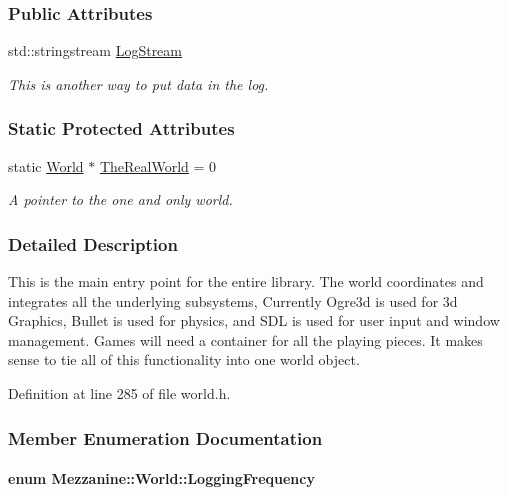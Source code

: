 \subsubsection*{Public Attributes}
\begin{DoxyCompactItemize}
\item 
std::stringstream \hyperlink{classMezzanine_1_1World_a32b1c4de1bbf5495452e463802ffa499}{LogStream}
\begin{DoxyCompactList}\small\item\em This is another way to put data in the log. \item\end{DoxyCompactList}\end{DoxyCompactItemize}
\subsubsection*{Static Protected Attributes}
\begin{DoxyCompactItemize}
\item 
\hypertarget{classMezzanine_1_1World_a86c5d362a144d6cad245fd022f512b21}{
static \hyperlink{classMezzanine_1_1World}{World} $\ast$ \hyperlink{classMezzanine_1_1World_a86c5d362a144d6cad245fd022f512b21}{TheRealWorld} = 0}
\label{classMezzanine_1_1World_a86c5d362a144d6cad245fd022f512b21}

\begin{DoxyCompactList}\small\item\em A pointer to the one and only world. \item\end{DoxyCompactList}\end{DoxyCompactItemize}


\subsubsection{Detailed Description}
This is the main entry point for the entire library. The world coordinates and integrates all the underlying subsystems, Currently Ogre3d is used for 3d Graphics, Bullet is used for physics, and SDL is used for user input and window management. Games will need a container for all the playing pieces. It makes sense to tie all of this functionality into one world object. 

Definition at line 285 of file world.h.



\subsubsection{Member Enumeration Documentation}
\hypertarget{classMezzanine_1_1World_a535c832832bbdebcdc623c3472a32e25}{
\paragraph[{LoggingFrequency}]{\setlength{\rightskip}{0pt plus 5cm}enum {\bf Mezzanine::World::LoggingFrequency}}\hfill}
\label{classMezzanine_1_1World_a535c832832bbdebcdc623c3472a32e25}


